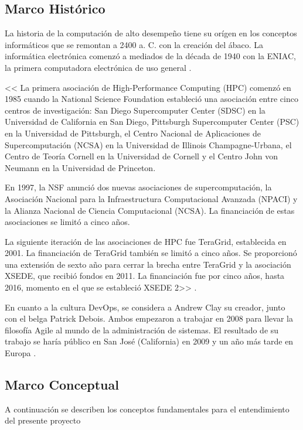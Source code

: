 \documentclass[letterpaper, 12pt, oneside]{article}
\begin{document}
    \subsection{Marco Histórico}
    
    
    La historia de la computación de alto desempeño tiene su orígen en los conceptos informáticos que se remontan a 2400 a. C. con la creación del ábaco.
    La informática electrónica comenzó a mediados de la década de 1940 con la ENIAC, la primera computadora electrónica de uso general \cite{hpcHistory}.
    
   << La primera asociación de High-Performance Computing (HPC) comenzó en 1985 cuando la National Science Foundation estableció una asociación entre cinco centros de investigación: San Diego Supercomputer Center (SDSC) en la Universidad de California en San Diego, Pittsburgh Supercomputer Center (PSC) en la Universidad de Pittsburgh, el Centro Nacional de Aplicaciones de Supercomputación (NCSA) en la Universidad de Illinois Champagne-Urbana, el Centro de Teoría Cornell en la Universidad de Cornell y el Centro John von Neumann en la Universidad de Princeton.
    
    En 1997, la NSF anunció dos nuevas asociaciones de supercomputación, la Asociación Nacional para la Infraestructura Computacional Avanzada (NPACI) y la Alianza Nacional de Ciencia Computacional (NCSA). La financiación de estas asociaciones se limitó a cinco años.
    
    La siguiente iteración de las asociaciones de HPC fue TeraGrid, establecida en 2001. La financiación de TeraGrid también se limitó a cinco años. Se proporcionó una extensión de sexto año para cerrar la brecha entre TeraGrid y la asociación XSEDE, que recibió fondos en 2011. La financiación fue por cinco años, hasta 2016, momento en el que se estableció XSEDE 2>> \cite{hpcHistory} .
    
    En cuanto a la cultura DevOps, se considera a Andrew Clay su creador, junto con el belga Patrick Debois. Ambos empezaron a trabajar en 2008 para llevar la filosofía Agile al mundo de la administración de sistemas. El resultado de su trabajo se haría público en San José (California) en 2009 y un año más tarde en Europa \cite{devopsHistory1}  .
    
    \subsection{Marco Conceptual}
    
    A continuación se describen los conceptos fundamentales para el entendimiento del presente proyecto
    
\end{document}
